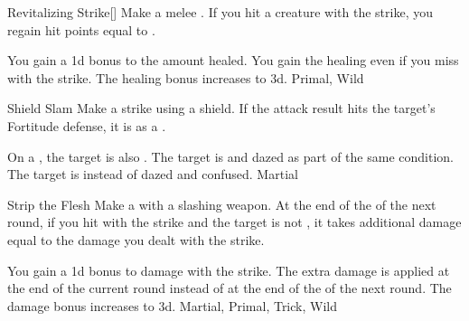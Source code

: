 \lowercase{\hypertarget{maneuver:Revitalizing Strike}{}}\label{maneuver:Revitalizing Strike}
\hypertarget{maneuver:Revitalizing Strike}{}
\begin{freeability}{Revitalizing Strike}[]
Make a melee .
If you hit a creature with the strike, you regain hit points equal to .

\rankline
{} You gain a \plus1d bonus to the amount healed.
 You gain the healing even if you miss with the strike.
 The healing bonus increases to \plus3d.
 Primal, Wild
\end{freeability}
\vspace{0.25em}



\lowercase{\hypertarget{maneuver:Shield Slam}{}}\label{maneuver:Shield Slam}
\hypertarget{maneuver:Shield Slam}{}
\begin{freeability}{Shield Slam}
Make a strike using a shield.
If the attack result hits the target's Fortitude defense,
it is  as a .

\rankline
{} On a , the target is also .
 The target is  and dazed as part of the same condition.
 The target is  instead of dazed and confused.
 Martial
\end{freeability}
\vspace{0.25em}



\lowercase{\hypertarget{maneuver:Strip the Flesh}{}}\label{maneuver:Strip the Flesh}
\hypertarget{maneuver:Strip the Flesh}{}
\begin{freeability}{Strip the Flesh}
Make a  with a slashing weapon.
At the end of the  of the next round,
if you hit with the strike and the target is not ,
it takes additional damage equal to the damage you dealt with the strike.

\rankline
{} You gain a \plus1d bonus to damage with the strike.
 The extra damage is applied at the end of the current round instead of at the end of the  of the next round.
 The damage bonus increases to \plus3d.
 Martial, Primal, Trick, Wild
\end{freeability}
\vspace{0.25em}



